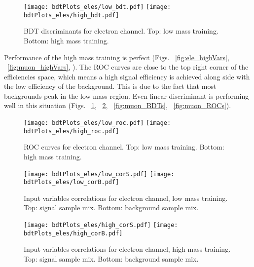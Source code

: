 \begin{figure}[tbp]
  \begin{center}
   \texttt{[image: bdtPlots\_eles/low\_bdt.pdf]}
   \texttt{[image: bdtPlots\_eles/high\_bdt.pdf]}
    \caption{ BDT discriminants for electron channel. Top: low mass training. Bottom: high mass training. }
    \label{fig:ele_BDTs}
  \end{center}
\end{figure}

Performance of the high mass training is perfect (Figs. ~\ref{fig:ele_highVars}, ~\ref{fig:muon_highVars}, ). The ROC curves are close to the top right corner of the efficiencies space, which means a high signal efficiency is achieved along side with the low efficiency of the background. This is due to the
fact that most backgrounds peak in the low mass region. Even linear
discriminant is performing well in this situation (Figs. ~\ref{fig:ele_BDTs}, ~\ref{fig:ele_ROCs}, ~\ref{fig:muon_BDTs}, ~\ref{fig:muon_ROCs}).

\begin{figure}[tbp]
  \begin{center}
   \texttt{[image: bdtPlots\_eles/low\_roc.pdf]}
   \texttt{[image: bdtPlots\_eles/high\_roc.pdf]}
    \caption{ ROC curves for electron channel. Top: low mass training. Bottom: high mass training. }
    \label{fig:ele_ROCs}
  \end{center}
\end{figure}

\begin{figure}[tbp]
  \begin{center}
   \texttt{[image: bdtPlots\_eles/low\_corS.pdf]}
   \texttt{[image: bdtPlots\_eles/low\_corB.pdf]}
    \caption{ Input variables correlations for electron channel, low mass training. Top: signal sample mix. Bottom: background sample mix. }
    \label{fig:ele_cors_low}
  \end{center}
\end{figure}


\begin{figure}[tbp]
  \begin{center}
   \texttt{[image: bdtPlots\_eles/high\_corS.pdf]}
   \texttt{[image: bdtPlots\_eles/high\_corB.pdf]}
    \caption{ Input variables correlations for electron channel, high mass training. Top: signal sample mix. Bottom: background sample mix. }
    \label{fig:ele_cors_high}
  \end{center}
\end{figure}



